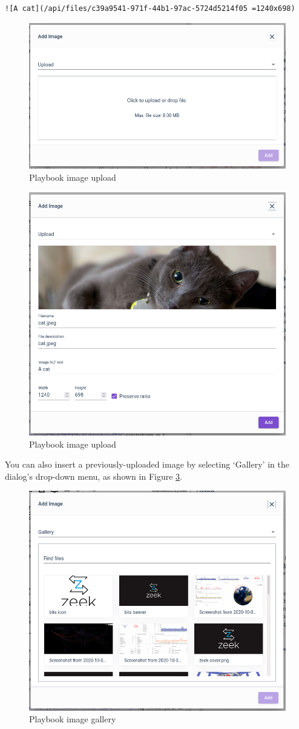 \begin{verbatim}
![A cat](/api/files/c39a9541-971f-44b1-97ac-5724d5214f05 =1240x698)
\end{verbatim}

\begin{figure}[H]
	\includegraphics[width=0.6\linewidth]{images/playbook-upload.png}
	\caption{Playbook image upload}
	\label{fig:playbook-upload}
\end{figure}

\begin{figure}[H]
	\includegraphics[width=0.6\linewidth]{images/playbook-upload2.png}
	\caption{Playbook image upload}
	\label{fig:playbook-upload2}
\end{figure}

You can also insert a previously-uploaded image by selecting `Gallery' in the dialog's drop-down menu, as shown in Figure \ref{fig:playbook-gallery}.

\begin{figure}[H]
	\includegraphics[width=0.6\linewidth]{images/playbook-gallery.png}
	\caption{Playbook image gallery}
	\label{fig:playbook-gallery}
\end{figure}
